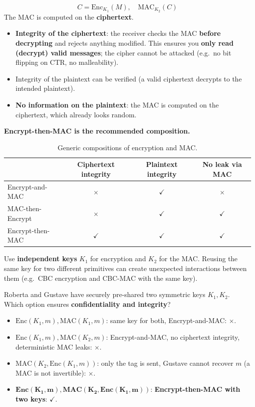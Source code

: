 \[
\boxed{C = \mathrm{Enc}_{K_1}(M), \quad \mathrm{MAC}_{K_2}(C)}
\]
The MAC is computed on the \textbf{ciphertext}.
\begin{itemize}
    \item[$+$] \textbf{Integrity of the ciphertext}: the receiver checks the MAC \textbf{before decrypting} and rejects anything modified. This ensures you \textbf{only read (decrypt) valid messages}; the cipher cannot be attacked (e.g.\ no bit flipping on CTR, no malleability).
    \item[$+$] Integrity of the plaintext can be verified (a valid ciphertext decrypts to the intended plaintext).
    \item[$+$] \textbf{No information on the plaintext}: the MAC is computed on the ciphertext, which already looks random.
\end{itemize}
\textbf{Encrypt-then-MAC is the recommended composition.}

\begin{table}[h]
\centering
\begin{tabular}{@{}lccc@{}}
\toprule
 & \textbf{Ciphertext integrity} & \textbf{Plaintext integrity} & \textbf{No leak via MAC} \\
\midrule
Encrypt-and-MAC & $\times$ & $\checkmark$ & $\times$ \\
MAC-then-Encrypt & $\times$ & $\checkmark$ & $\checkmark$ \\
Encrypt-then-MAC & $\checkmark$ & $\checkmark$ & $\checkmark$ \\
\bottomrule
\end{tabular}
\caption{Generic compositions of encryption and MAC.}
\end{table}

\begin{remark}
Use \textbf{independent keys} $K_1$ for encryption and $K_2$ for the MAC. Reusing the same key for two different primitives can create unexpected interactions between them (e.g.\ CBC encryption and CBC-MAC with the same key).
\end{remark}

\begin{example}
Roberta and Gustave have securely pre-shared two symmetric keys $K_1, K_2$. Which option ensures \textbf{confidentiality and integrity}?
\begin{itemize}
    \item $\mathrm{Enc}(K_1, m), \mathrm{MAC}(K_1, m)$: same key for both, Encrypt-and-MAC: $\times$.
    \item $\mathrm{Enc}(K_1, m), \mathrm{MAC}(K_2, m)$: Encrypt-and-MAC, no ciphertext integrity, deterministic MAC leaks: $\times$.
    \item $\mathrm{MAC}(K_2, \mathrm{Enc}(K_1, m))$: only the tag is sent, Gustave cannot recover $m$ (a MAC is not invertible): $\times$.
    \item $\mathbf{Enc(K_1, m), MAC(K_2, Enc(K_1, m))}$: \textbf{Encrypt-then-MAC with two keys}: $\checkmark$.
\end{itemize}
\end{example}

